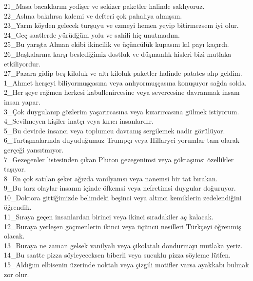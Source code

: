 21\_Masa bacaklarını yedişer ve sekizer paketler halinde saklıyoruz. \\
22\_Aslına bakılırsa kalemi ve defteri çok pahalıya almışsın. \\
23\_Yarın köyden gelecek turşuyu ve ezmeyi hemen yeyip bitirmezsem iyi olur. \\
24\_Geç saatlerde yürüdğüm yolu ve sahili hiç unutmadım. \\
25\_Bu yarışta Alman ekibi ikincilik ve üçüncülük kupasını kıl payı kaçırdı. \\
26\_Başkalarına karşı beslediğimiz dostluk ve düşmanlık hisleri bizi mutlaka etkiliyordur. \\
27\_Pazara gidip beş kiloluk ve altı kiloluk paketler halinde patates alıp geldim. \\
1\_Ahmet herşeyi biliyormuşçasına veya anlıyormuşçasına konuşuyor sağda solda. \\
2\_Her şeye rağmen herkesi kabullenircesine veya severcesine davranmak insanı insan yapar. \\
3\_Çok duygulanıp gözlerim yaşarırcasına veya kızarırcasına gülmek istiyorum. \\
4\_Sevilmeyen kişiler inatçı veya kırıcı insanlardır. \\
5\_Bu devirde insancı veya toplumcu davranış sergilemek nadir görülüyor. \\
6\_Tartışmalarında duyuduğumuz Trumpçı veya Hillaryci yorumlar tam olarak gerçeği yansıtmıyor. \\
7\_Gezegenler listesinden çıkan Pluton gezegenimsi veya göktaşımsı özellikler taşıyor. \\
8\_En çok satılan şeker ağızda vanilyamsı veya nanemsi bir tat bırakan. \\
9\_Bu tarz olaylar insanın içinde öfkemsi veya nefretimsi duygular doğuruyor. \\
10\_Doktora gittiğimizde belimdeki beşinci veya altıncı kemiklerin zedelendiğini öğrendik. \\
11\_Sıraya geçen insanlardan birinci veya ikinci sıradakiler aç kalacak. \\
12\_Buraya yerleşen göçmenlerin ikinci veya üçüncü nesilleri Türkçeyi öğrenmiş olacak. \\
13\_Buraya ne zaman gelsek vanilyalı veya çikolatalı dondurmayı mutlaka yeriz. \\
14\_Bu saatte pizza söyleyeceksen biberli veya sucuklu pizza söyleme lütfen. \\
15\_Aldığım elbisenin üzerinde noktalı veya çizgili motifler varsa ayakkabı bulmak zor olur. \\
